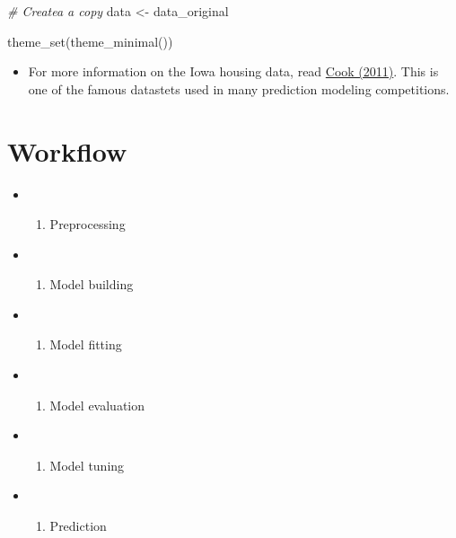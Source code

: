 \documentclass[
]{book}
\newenvironment{Shaded}{\begin{snugshade}}{\end{snugshade}}
\newcommand{\CommentTok}[1]{\textcolor[rgb]{0.56,0.35,0.01}{\textit{#1}}}
\newcommand{\FunctionTok}[1]{\textcolor[rgb]{0.00,0.00,0.00}{#1}}
\newcommand{\NormalTok}[1]{#1}
\newcommand{\OtherTok}[1]{\textcolor[rgb]{0.56,0.35,0.01}{#1}}
\providecommand{\tightlist}{%
  \setlength{\itemsep}{0pt}\setlength{\parskip}{0pt}}
\begin{document}
\begin{Shaded}
\begin{Highlighting}[]
\CommentTok{\# Createa a copy }
\NormalTok{data }\OtherTok{\textless{}{-}}\NormalTok{ data\_original}

\FunctionTok{theme\_set}\NormalTok{(}\FunctionTok{theme\_minimal}\NormalTok{())}
\end{Highlighting}
\end{Shaded}

\begin{itemize}
\tightlist
\item
  For more information on the Iowa housing data, read \href{http://jse.amstat.org/v19n3/decock.pdf}{Cook (2011)}. This is one of the famous datastets used in many prediction modeling competitions.
\end{itemize}

\hypertarget{workflow-3}{%
\section{Workflow}\label{workflow-3}}

\begin{itemize}
\item
  \begin{enumerate}
  \def\labelenumi{\arabic{enumi}.}
  \tightlist
  \item
    Preprocessing
  \end{enumerate}
\item
  \begin{enumerate}
  \def\labelenumi{\arabic{enumi}.}
  \setcounter{enumi}{1}
  \tightlist
  \item
    Model building
  \end{enumerate}
\item
  \begin{enumerate}
  \def\labelenumi{\arabic{enumi}.}
  \setcounter{enumi}{2}
  \tightlist
  \item
    Model fitting
  \end{enumerate}
\item
  \begin{enumerate}
  \def\labelenumi{\arabic{enumi}.}
  \setcounter{enumi}{3}
  \tightlist
  \item
    Model evaluation
  \end{enumerate}
\item
  \begin{enumerate}
  \def\labelenumi{\arabic{enumi}.}
  \setcounter{enumi}{4}
  \tightlist
  \item
    Model tuning
  \end{enumerate}
\item
  \begin{enumerate}
  \def\labelenumi{\arabic{enumi}.}
  \setcounter{enumi}{5}
  \tightlist
  \item
    Prediction
  \end{enumerate}
\end{itemize}
\end{document}
